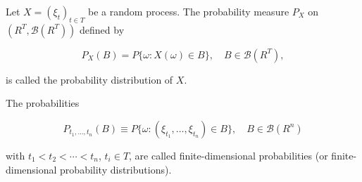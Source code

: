 Let $X = (\xi_t)_{t \in T}$ be a random process. The probability measure $P_X$ on $(R^T, \mathcal{B}(R^T))$ defined by

$$P_X(B) = P\{\omega : X(\omega) \in B\}, \quad B \in \mathcal{B}(R^T),$$

is called the probability distribution of $X$.

The probabilities

$$P_{t_1, \ldots, t_n}(B) \equiv P\{\omega : (\xi_{t_1}, \ldots, \xi_{t_n}) \in B\}, \quad B \in \mathcal{B}(R^n)$$

with $t_1 < t_2 < \cdots < t_n$, $t_i \in T$, are called finite-dimensional probabilities (or finite-dimensional probability distributions).
